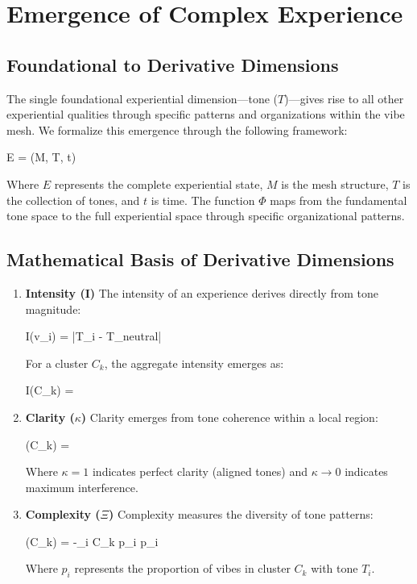 \documentclass{article}
\let\oldequation\equation
\let\endoldequation\endequation
\renewenvironment{equation}{%
    \noindent\vspace{-\parskip}\vspace{-\baselineskip}%
    \oldequation
}{%
    \endoldequation
    \noindent\vspace{-\parskip}\vspace{-\baselineskip}%
}
\theoremstyle{definition}
\theoremstyle{axiom}
\theoremstyle{theorem}
\theoremstyle{proposition}
\begin{document}
\section{Emergence of Complex Experience}

\subsection{Foundational to Derivative Dimensions}

The single foundational experiential dimension---tone ($T$)---gives rise to all other experiential qualities through specific patterns and organizations within the vibe mesh. We formalize this emergence through the following framework:

\begin{equation}
E = \Phi(M, T, t)
\end{equation}

Where $E$ represents the complete experiential state, $M$ is the mesh structure, $T$ is the collection of tones, and $t$ is time. The function $\Phi$ maps from the fundamental tone space to the full experiential space through specific organizational patterns.

\subsection{Mathematical Basis of Derivative Dimensions}

\begin{enumerate}
\item \textbf{Intensity (I)} The intensity of an experience derives directly from tone magnitude:

\begin{equation}
I(v_i) = |T_i - T_{neutral}|
\end{equation}

For a cluster $C_k$, the aggregate intensity emerges as:

\begin{equation}
I(C_k) = 
\end{equation}

\item \textbf{Clarity ($\kappa$)} Clarity emerges from tone coherence within a local region:

\begin{equation}
\kappa(C_k) = 
\end{equation}

Where $\kappa = 1$ indicates perfect clarity (aligned tones) and $\kappa \to 0$ indicates maximum interference.

\item \textbf{Complexity ($\Xi$)} Complexity measures the diversity of tone patterns:

\begin{equation}
\Xi(C_k) = -\sum_{i \in C_k} p_i \log p_i
\end{equation}

Where $p_i$ represents the proportion of vibes in cluster $C_k$ with tone $T_i$.
\end{enumerate}
\end{document}
